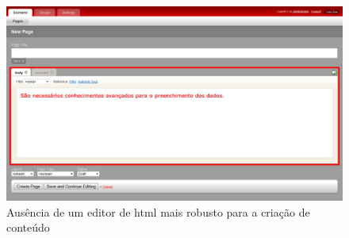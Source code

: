 \begin{figure}[here]
\includegraphics[width=150mm]{images/radiant_erro_conhecimento.jpg}
\caption{Ausência de um editor de html mais robusto para a criação de conteúdo}
\label{fig:falta_editor_radiant}
\end{figure}


